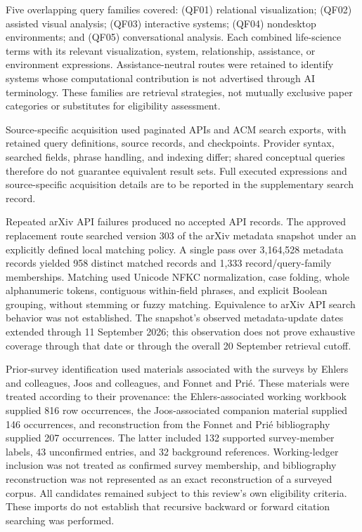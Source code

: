 Five overlapping query families covered: (QF01) relational visualization; (QF02) assisted visual analysis; (QF03) interactive systems; (QF04) nondesktop environments; and (QF05) conversational analysis. Each combined life-science terms with its relevant visualization, system, relationship, assistance, or environment expressions. Assistance-neutral routes were retained to identify systems whose computational contribution is not advertised through AI terminology. These families are retrieval strategies, not mutually exclusive paper categories or substitutes for eligibility assessment.

Source-specific acquisition used paginated APIs and ACM search exports, with retained query definitions, source records, and checkpoints. Provider syntax, searched fields, phrase handling, and indexing differ; shared conceptual queries therefore do not guarantee equivalent result sets. Full executed expressions and source-specific acquisition details are to be reported in the supplementary search record.

Repeated arXiv API failures produced no accepted API records. The approved replacement route searched version 303 of the arXiv metadata snapshot under an explicitly defined local matching policy. A single pass over 3,164,528 metadata records yielded 958 distinct matched records and 1,333 record/query-family memberships. Matching used Unicode NFKC normalization, case folding, whole alphanumeric tokens, contiguous within-field phrases, and explicit Boolean grouping, without stemming or fuzzy matching. Equivalence to arXiv API search behavior was not established. The snapshot's observed metadata-update dates extended through 11 September 2026; this observation does not prove exhaustive coverage through that date or through the overall 20 September retrieval cutoff.

Prior-survey identification used materials associated with the surveys by Ehlers and colleagues, Joos and colleagues, and Fonnet and Pri\'e. These materials were treated according to their provenance: the Ehlers-associated working workbook supplied 816 row occurrences, the Joos-associated companion material supplied 146 occurrences, and reconstruction from the Fonnet and Pri\'e bibliography supplied 207 occurrences. The latter included 132 supported survey-member labels, 43 unconfirmed entries, and 32 background references. Working-ledger inclusion was not treated as confirmed survey membership, and bibliography reconstruction was not represented as an exact reconstruction of a surveyed corpus. All candidates remained subject to this review's own eligibility criteria. These imports do not establish that recursive backward or forward citation searching was performed.

